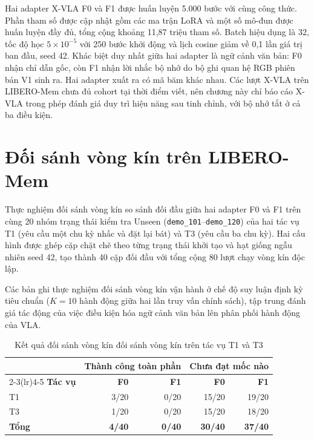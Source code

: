 Hai adapter X-VLA F0 và F1 được huấn luyện 5.000 bước với cùng công thức. Phần tham số được cập nhật gồm các ma trận LoRA và một số mô-đun được huấn luyện đầy đủ, tổng cộng khoảng 11,87 triệu tham số. Batch hiệu dụng là 32, tốc độ học $5\times10^{-5}$ với 250 bước khởi động và lịch cosine giảm về 0,1 lần giá trị ban đầu, seed 42. Khác biệt duy nhất giữa hai adapter là ngữ cảnh văn bản: F0 nhận chỉ dẫn gốc, còn F1 nhận lời nhắc bộ nhớ do bộ ghi quan hệ RGB phiên bản V1 sinh ra. Hai adapter xuất ra có mã băm khác nhau. Các lượt X-VLA trên LIBERO-Mem chưa đủ cohort tại thời điểm viết, nên chương này chỉ báo cáo X-VLA trong phép đánh giá duy trì hiệu năng sau tinh chỉnh, với bộ nhớ tắt ở cả ba điều kiện.

\section{Đối sánh vòng kín trên LIBERO-Mem}

Thực nghiệm đối sánh vòng kín so sánh đối đầu giữa hai adapter F0 và F1 trên cùng 20 nhóm trạng thái kiểm tra Unseen (\texttt{demo\_101}--\texttt{demo\_120}) của hai tác vụ T1 (yêu cầu một chu kỳ nhấc và đặt lại bát) và T3 (yêu cầu ba chu kỳ). Hai cấu hình được ghép cặp chặt chẽ theo từng trạng thái khởi tạo và hạt giống ngẫu nhiên seed 42, tạo thành 40 cặp đối đầu với tổng cộng 80 lượt chạy vòng kín độc lập.

Các bản ghi thực nghiệm đối sánh vòng kín vận hành ở chế độ suy luận định kỳ tiêu chuẩn ($K = 10$ hành động giữa hai lần truy vấn chính sách), tập trung đánh giá tác động của việc điều kiện hóa ngữ cảnh văn bản lên phân phối hành động của VLA.

\begin{table}[htbp]
\centering\small
\caption{Kết quả đối sánh vòng kín đối sánh vòng kín trên tác vụ T1 và T3}
\label{tab:e2-unseen-results}
\begin{tabular}{lrrrr}
\toprule
& \multicolumn{2}{c}{\textbf{Thành công toàn phần}} & \multicolumn{2}{c}{\textbf{Chưa đạt mốc nào}} \\
\cmidrule(lr){2-3}\cmidrule(lr){4-5}
\textbf{Tác vụ} & \textbf{F0} & \textbf{F1} & \textbf{F0} & \textbf{F1} \\
\midrule
T1 & 3/20 & 0/20 & 15/20 & 19/20 \\
T3 & 1/20 & 0/20 & 15/20 & 18/20 \\
\textbf{Tổng} & \textbf{4/40} & \textbf{0/40} & \textbf{30/40} & \textbf{37/40} \\
\bottomrule
\end{tabular}
\end{table}

